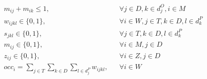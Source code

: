 \documentclass[../../thesis.tex]{subfiles}
\begin{document}
\begin{align}
    & m_{ij} + m_{ik} \leq 1, && \forall j \in D, k \in d^O_j, i \in M  \label{mc3} \\
    & w_{ijkl} \in \{0, 1\}, && \forall i \in W, j \in T, k \in D, l \in d^P_k \label{binary1} \\
    & s_{jkl} \in \{0, 1\}, && \forall j \in T, k \in D, l \in d^P_k \label{binary2} \\
    & m_{ij} \in \{0, 1\}, && \forall i \in M, j \in D \label{binary3} \\ 
    & z_{ij} \in \{0, 1\}, && \forall i \in Z, j \in D \label{binary4} \\ 
    & occ_i = \sum_{j \in T} \sum_{k \in D} \sum_{l \in d^P_j} w_{ijkl}, && \forall i \in W \label{occ}
\end{align}
\endgroup
\end{document}
